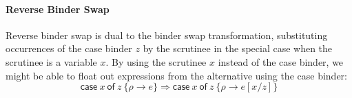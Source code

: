 \documentclass[acmsmall,review,anonymous,screen]{acmart}
\newcommand{\ccase}[2]{\mathsf{case}~#1~\mathsf{of}~#2}
\begin{document}
% 

\paragraph{Reverse Binder Swap\label{sec:reverse-binder-swap-considered-harmful}}

%

Reverse binder swap is dual to the binder swap transformation, substituting
occurrences of the case binder $z$ by the scrutinee in the special case when
the scrutinee is a variable $x$.
%
By using the scrutinee $x$ instead of the case binder, we might be able to
float out expressions from the alternative using the case binder:
\[
    \ccase{x}{z~\{\rho \rightarrow e\}} \Rightarrow \ccase{x}{z~\{\rho \rightarrow e[x/z]\}}
\]
\end{document}
